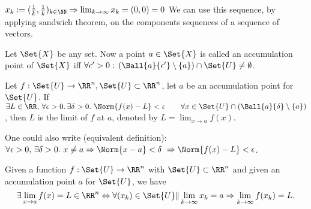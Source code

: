 \begin{exam}
 $x_k:=(\frac{1}{k},\frac{1}{k})_{k\in\NN}\Rightarrow \lim_{k\to\infty}x_k=(0,0)=0$
 We can use this sequence, by applying sandwich theorem, on the components sequences of a sequence of vectors.
\end{exam}
\begin{defn} Let $\Set{X}$ be any set. Now a point $a\in\Set{X}$ is called an accumulation point of $\Set{X}$ iff $\forall \epsilon'>0:\,(\Ball{a}{\epsilon'}\setminus\{a\})\cap \Set{U}\neq \emptyset$. 
\end{defn}
\begin{defn}
 Let $f:\Set{U}\to\RR^n, \Set{U}\subset\RR^n$, let $a$ be an accumulation point for $\Set{U}$. If $\exists L\in\RR,\,\forall\epsilon>0.\,\exists\delta>0.\ \Norm{f(x)-L}<\epsilon\qquad\forall x\in \Set{U}\cap(\Ball{a}{\delta}\setminus\{a\})$, then $L$ is the limit of $f$ at $a$, denoted by $L=\lim_{x\to a}f(x)$. 
\end{defn}
\begin{rem}
 One could also write (equivalent definition): $\forall \epsilon>0,\,\exists\delta>0.\ x\neq a\Rightarrow\Norm{x-a}<\delta\ \Rightarrow\Norm{f(x)-L}<\epsilon$.
\end{rem}
\begin{lem}
 Given a function $f:\Set{U}\to\RR^n$ with $\Set{U}\subset\RR^n$ and given an accumulation point $a$ for $\Set{U}$, we have $$\exists\lim_{x\to a}f(x)=L\in\RR^n\Leftrightarrow\forall(x_k)\in\Set{U}\|\lim_{k\to\infty}x_k=a\Rightarrow \lim_{k\to\infty}f(x_k)=L.$$
\end{lem}
